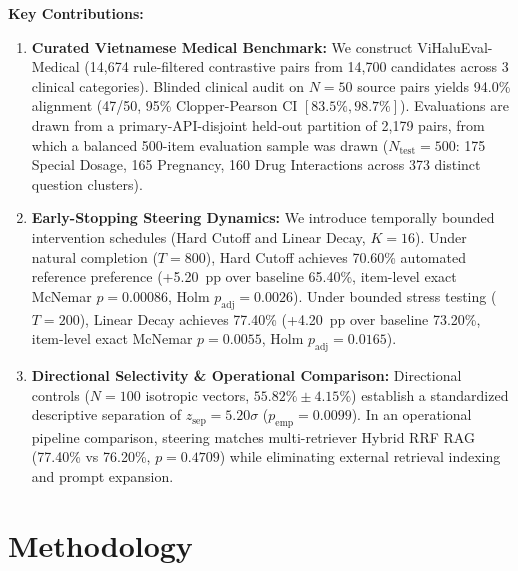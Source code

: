 \documentclass[runningheads]{llncs}
\begin{document}
\noindent\textbf{Key Contributions:}
\begin{enumerate}
    \item \textbf{Curated Vietnamese Medical Benchmark:} We construct ViHaluEval-Medical (14,674 rule-filtered contrastive pairs from 14,700 candidates across 3 clinical categories). Blinded clinical audit on $N=50$ source pairs yields 94.0\% alignment (47/50, 95\% Clopper-Pearson CI $[83.5\%, 98.7\%]$). Evaluations are drawn from a primary-API-disjoint held-out partition of 2,179 pairs, from which a balanced 500-item evaluation sample was drawn ($N_{\text{test}}=500$: 175 Special Dosage, 165 Pregnancy, 160 Drug Interactions across 373 distinct question clusters).
    \item \textbf{Early-Stopping Steering Dynamics:} We introduce temporally bounded intervention schedules (Hard Cutoff and Linear Decay, $K=16$). Under natural completion ($T=800$), Hard Cutoff achieves 70.60\% automated reference preference (+5.20~pp over baseline 65.40\%, item-level exact McNemar $p=0.00086$, Holm $p_{\text{adj}}=0.0026$). Under bounded stress testing ($T=200$), Linear Decay achieves 77.40\% (+4.20~pp over baseline 73.20\%, item-level exact McNemar $p=0.0055$, Holm $p_{\text{adj}}=0.0165$).
    \item \textbf{Directional Selectivity \& Operational Comparison:} Directional controls ($N=100$ isotropic vectors, $55.82\% \pm 4.15\%$) establish a standardized descriptive separation of $z_{\text{sep}}=5.20\sigma$ ($p_{\text{emp}}=0.0099$). In an operational pipeline comparison, steering matches multi-retriever Hybrid RRF RAG (77.40\% vs 76.20\%, $p=0.4709$) while eliminating external retrieval indexing and prompt expansion.
\end{enumerate}

\section{Methodology}\label{sec:methodology}
\end{document}
